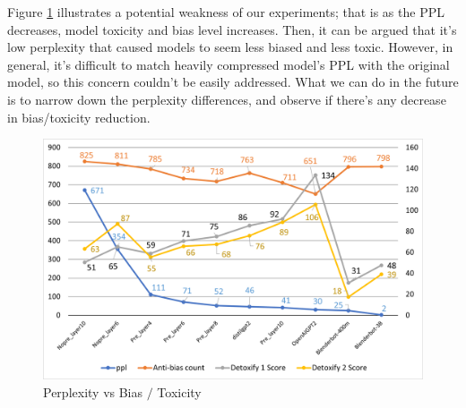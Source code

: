Figure \ref{fig: ppl_bias_t} illustrates a potential weakness of our experiments; that is as the PPL decreases, model toxicity and bias level increases. Then, it can be argued that it's low perplexity that caused models to seem less biased and less toxic. However, in general, it's difficult to match heavily compressed model's PPL with the original model, so this concern couldn't be easily addressed. What we can do in the future is to narrow down the perplexity differences, and observe if there's any decrease in bias/toxicity reduction. 

\begin{figure}[ht!]
\includegraphics[scale = 0.4]{graphs/ppl_bias_toxicity.png}
\caption{Perplexity vs Bias $/$ Toxicity}
\centering
\label{fig: ppl_bias_t}
\end{figure}


